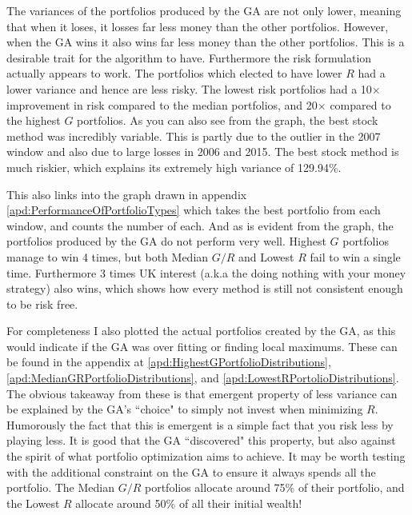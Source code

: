 \documentclass[11pt]{article}
\begin{document}
    The variances of the portfolios produced by the GA are not only lower, meaning that
    when it loses, it losses far less money than the other portfolios. However, when the GA wins
    it also wins far less money than the other portfolios. This is a
    desirable trait for the algorithm to have. Furthermore the risk formulation
    actually appears to work. The portfolios which elected to have lower \(R\)
    had a lower variance and hence are less risky. The lowest risk portfolios
    had a 10\(\times\) improvement in risk compared to the median portfolios, and 20\(\times\)
    compared to the highest \(G\) portfolios. As you can also see from the graph, the best
    stock method was incredibly variable. This is partly due to the outlier in the 2007
    window and also due to large losses in 2006 and 2015. The best stock method
    is much riskier, which explains its extremely high variance of 129.94\%.

    This also links into the graph drawn in appendix \ref{apd:PerformanceOfPortfolioTypes}
    which takes the best portfolio from each window, and counts the number of each.
    And as is evident from the graph, the portfolios produced by the GA do not
    perform very well. Highest \(G\) portfolios manage to win 4 times, but both
    Median \(G/R\) and Lowest \(R\) fail to win a single time. Furthermore 3
    times UK interest (a.k.a the doing nothing with your money strategy)
    also wins, which shows how every method is still not consistent enough to
    be risk free.

    For completeness I also plotted the actual portfolios created by the GA, as this
    would indicate if the GA was over fitting or finding local maximums. These can
    be found in the appendix at \ref{apd:HighestGPortfolioDistributions},
    \ref{apd:MedianGRPortfolioDistributions}, and
    \ref{apd:LowestRPortolioDistributions}. The obvious takeaway from these is that
    emergent property of less variance can be explained by the GA's ``choice" to
    simply not invest when minimizing \(R\). Humorously the fact that this is emergent
    is a simple fact that you risk less by playing less. It is good that the GA
    ``discovered" this property, but also against the spirit of what portfolio
    optimization aims to achieve. It may be worth testing with the additional
    constraint on the GA to ensure it always spends all the portfolio. The Median
    \(G/R\) portfolios allocate around 75\% of their portfolio,
    and the Lowest \(R\) allocate around 50\% of all their initial wealth!
\end{document}
